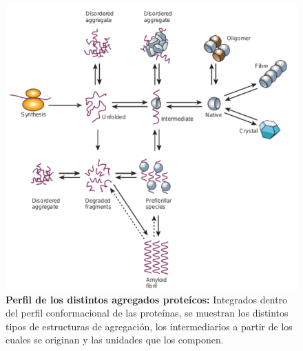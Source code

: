 \begin{figure}[h!,centered]
\includegraphics[width=\textwidth]{img/aggregationDiagram.png} 
\caption{\textbf{Perfil de los distintos agregados proteícos:} Integrados dentro del perfil conformacional de las proteínas, se muestran los distintos tipos de estructuras de agregación, 
los intermediarios a partir de los cuales se originan y las unidades que los componen.
} \label{aggregationDiagram}
\end{figure}


